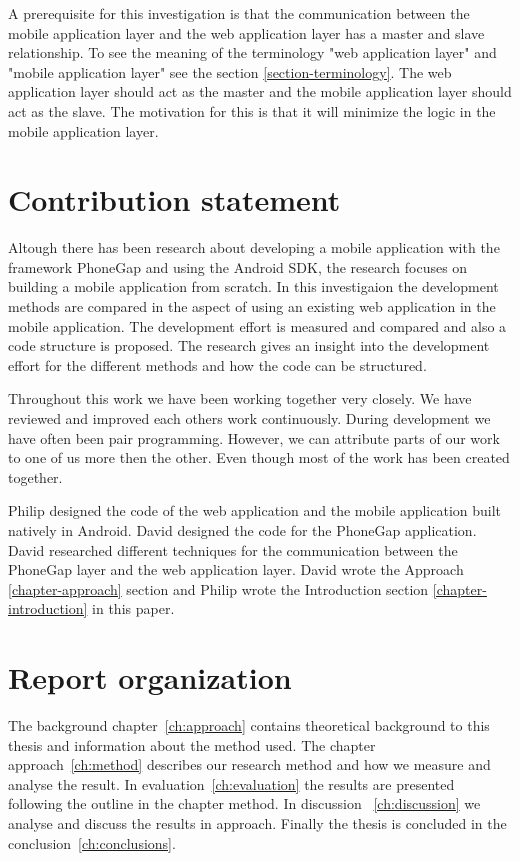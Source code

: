 A prerequisite for this investigation is that the communication between the mobile application layer and the web application layer has a master and slave relationship. To see the meaning of the terminology "web application layer" and "mobile application layer" see the section \ref{section-terminology}. The web application layer should act as the master and the mobile application layer should act as the slave. The motivation for this is that it will minimize the logic in the mobile application layer. 

\section{Contribution statement}\label{sec:contribution-statement}
Altough there has been research about developing a mobile application with the framework PhoneGap and using the Android SDK, the research focuses on building a mobile application from scratch. In this investigaion the development methods are compared in the aspect of using an existing web application in the mobile application. The development effort is measured and compared and also a code structure is proposed. The research gives an insight into the development effort for the different methods and how the code can be structured.

Throughout this work we have been working together very closely. We have reviewed and improved each others work continuously. During development we have often been pair programming. However, we can attribute parts of our work to one of us more then the other. Even though most of the work has been created together. 

Philip designed the code of the web application and the mobile application built natively in Android. David designed the code for the PhoneGap application. David researched different techniques for the communication between the PhoneGap layer and the web application layer. David wrote the Approach \ref{chapter-approach} section and Philip wrote the Introduction section \ref{chapter-introduction} in this paper. 

\section{Report organization}\label{sec:report-organization}
The background chapter~\ref{ch:approach} contains theoretical background to this thesis and information about the method used. The chapter approach~\ref{ch:method} describes our research method and how we measure and analyse the result. In evaluation~\ref{ch:evaluation} the results are presented following the outline in the chapter method. In discussion ~\ref{ch:discussion} we analyse and discuss the results in approach. Finally the thesis is concluded in the conclusion~\ref{ch:conclusions}.